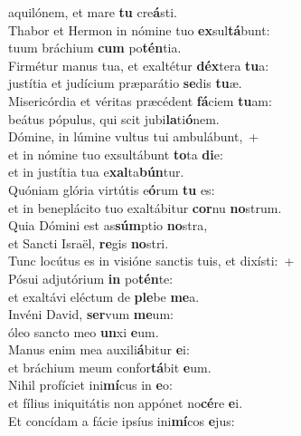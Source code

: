 \evenverse aquilónem, et mare \textbf{tu} cre\textbf{á}sti.\\
\oddverse Thabor et Hermon in nómine tuo \textbf{ex}sul\textbf{tá}bunt:~\*\\
\oddverse tuum bráchium \textbf{cum} po\textbf{tén}tia.\\
\evenverse Firmétur manus tua, et exaltétur \textbf{déx}tera \textbf{tu}a:~\*\\
\evenverse justítia et judícium præparátio \textbf{se}dis \textbf{tu}æ.\\
\oddverse Misericórdia et véritas præcédent \textbf{fá}ciem \textbf{tu}am:~\*\\
\oddverse beátus pópulus, qui scit jubi\textbf{la}ti\textbf{ó}nem.\\
\evenverse Dómine, in lúmine vultus tui ambulábunt,~+\\
\evenverse  et in nómine tuo exsultábunt \textbf{to}ta \textbf{di}e:~\*\\
\evenverse et in justítia tua e\textbf{xal}ta\textbf{bún}tur.\\
\oddverse Quóniam glória virtútis e\textbf{ó}rum \textbf{tu} es:~\*\\
\oddverse et in beneplácito tuo exaltábitur \textbf{cor}nu \textbf{no}strum.\\
\evenverse Quia Dómini est as\textbf{súm}ptio \textbf{no}stra,~\*\\
\evenverse et Sancti Israël, \textbf{re}gis \textbf{no}stri.\\
\oddverse Tunc locútus es in visióne sanctis tuis, et dixísti:~+\\
\oddverse  Pósui adjutórium \textbf{in} po\textbf{tén}te:~\*\\
\oddverse et exaltávi eléctum de \textbf{ple}be \textbf{me}a.\\
\evenverse Invéni David, \textbf{ser}vum \textbf{me}um:~\*\\
\evenverse óleo sancto meo \textbf{un}xi \textbf{e}um.\\
\oddverse Manus enim mea auxili\textbf{á}bitur \textbf{e}i:~\*\\
\oddverse et bráchium meum confor\textbf{tá}bit \textbf{e}um.\\
\evenverse Nihil profíciet ini\textbf{mí}cus in \textbf{e}o:~\*\\
\evenverse et fílius iniquitátis non appónet no\textbf{cé}re \textbf{e}i.\\
\oddverse Et concídam a fácie ipsíus ini\textbf{mí}cos \textbf{e}jus:~\*\\
